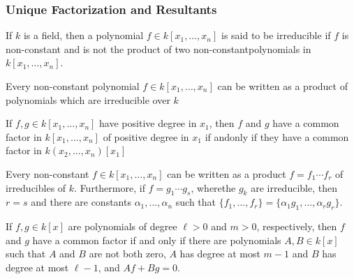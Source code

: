             \subsubsection{Unique Factorization and Resultants}
                \begin{definition}
                If $k$ is a field, then a polynomial $f\in k[x_1,\hdots ,x_n]$ is said to be irreducible if $f$ is non-constant and is not the product of two non-constantpolynomials in $k[x_1,\hdots ,x_n]$.
                \end{definition}
                \begin{theorem}
                Every non-constant polynomial $f\in k[x_1,\hdots ,x_n]$ can be written as a product of polynomials which are irreducible over $k$
                \end{theorem}
                \begin{theorem}
                If $f,g\in k[x_1,\hdots ,x_n]$ have positive degree in $x_1$, then $f$ and $g$ have a common factor in $k[x_1,\hdots ,x_n]$ of positive degree in $x_1$ if andonly if they have a common factor in $k(x_2,\hdots, x_n)[x_1]$
                \end{theorem}
                \begin{theorem}
                Every non-constant $f\in k[x_1,\hdots ,x_n]$ can be written as a product $f = f_1\cdots f_r$ of irreducibles of $k$. Furthermore, if $f = g_1\cdots g_s$, wherethe $g_k$ are irreducible, then $r=s$ and there are constants $\alpha_1,\hdots, \alpha_n$ such that $\{f_1,\hdots, f_r\} = \{\alpha_1 g_1, \hdots, \alpha_rg_r\}$.
                \end{theorem}
                \begin{theorem}
                If $f,g \in k[x]$ are polynomials of degree $\ell>0$ and $m>0$,
                respectively, then $f$ and $g$ have a common factor if and only
                if there are polynomials $A,B\in{k}[x]$ such that $A$ and $B$
                are not both zero, $A$ has degree at most $m-1$ and $B$ has
                degree at most $\ell-1$, and $Af+Bg = 0$.
                \end{theorem}
